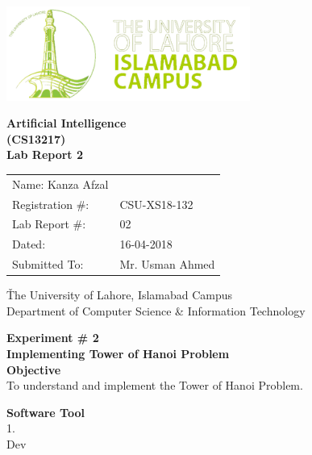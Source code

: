 \documentclass[11pt]{article}            %
\begin{document}
\begin{titlepage}
    \centering
  \vfill
    \includegraphics[width=8cm]{uni_logo.png} \\ 
	\vskip2cm
    {\bfseries\Large
	Artificial Intelligence \\ (CS13217)\\
	
	\vskip2cm
	Lab Report 2
	 
	\vskip2cm
	}    

\begin{center}
\begin{tabular}{ l l  } 

Name: Kanza Afzal \\ 
Registration \#: & CSU-XS18-132 \\ 
Lab Report \#: & 02 \\ 
 Dated:&16-04-2018\\ 
Submitted To:& Mr. Usman Ahmed\\ 

\end{tabular}
\end{center}
    \v
    The University of Lahore, Islamabad Campus\\
Department of Computer Science \& Information Technology
\end{titlepage}


    
    {\bfseries\Large
\centering
	Experiment \# 2 \\

Implementing Tower of Hanoi Problem\\
	
	}    
 \vskip1cm
 \textbf {Objective}\\  To understand and implement the Tower of Hanoi Problem.
 
 \textbf {Software Tool} \\
1.  \\Dev
\end{document}

